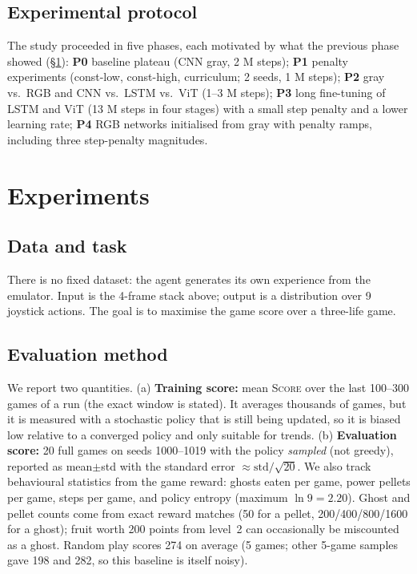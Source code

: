 \documentclass[11pt]{article}
\newcommand{\score}{\textsc{Score}}
\begin{document}
\subsection{Experimental protocol}
The study proceeded in five phases, each motivated by what the previous phase showed (\S\ref{sec:experiments}): \textbf{P0} baseline plateau (CNN gray, 2 M steps); \textbf{P1} penalty experiments (const-low, const-high, curriculum; 2 seeds, 1 M steps); \textbf{P2} gray vs.\ RGB and CNN vs.\ LSTM vs.\ ViT (1--3 M steps); \textbf{P3} long fine-tuning of LSTM and ViT (13 M steps in four stages) with a small step penalty and a lower learning rate; \textbf{P4} RGB networks initialised from gray with penalty ramps, including three step-penalty magnitudes.

\section{Experiments}
\label{sec:experiments}
\subsection{Data and task}
There is no fixed dataset: the agent generates its own experience from the emulator. Input is the 4-frame stack above; output is a distribution over 9 joystick actions. The goal is to maximise the game score over a three-life game.

\subsection{Evaluation method}
We report two quantities. (a) \textbf{Training score:} mean \score{} over the last 100--300 games of a run (the exact window is stated). It averages thousands of games, but it is measured with a stochastic policy that is still being updated, so it is biased low relative to a converged policy and only suitable for trends. (b) \textbf{Evaluation score:} 20 full games on seeds 1000--1019 with the policy \emph{sampled} (not greedy), reported as mean$\pm$std with the standard error $\approx\!\text{std}/\sqrt{20}$. We also track behavioural statistics from the game reward: ghosts eaten per game, power pellets per game, steps per game, and policy entropy (maximum $\ln 9 = 2.20$). Ghost and pellet counts come from exact reward matches (50 for a pellet, 200/400/800/1600 for a ghost); fruit worth 200 points from level~2 can occasionally be miscounted as a ghost. Random play scores 274 on average (5 games; other 5-game samples gave 198 and 282, so this baseline is itself noisy).
\end{document}
